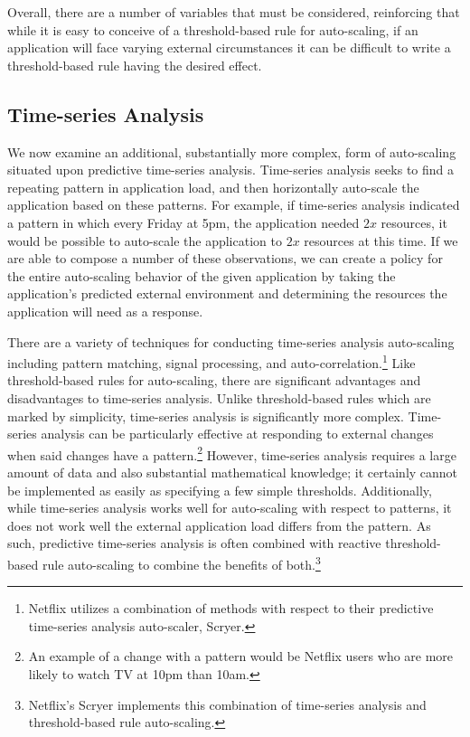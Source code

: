 \documentclass[twoside]{report}
\begin{document}
Overall, there are a number of variables that must be considered, reinforcing
that while it is easy to conceive of a threshold-based rule for auto-scaling, if
an application will face varying external circumstances it can be difficult to
write a threshold-based rule having the desired effect.

\subsection{Time-series Analysis}

We now examine an additional, substantially more complex, form of auto-scaling
situated upon predictive time-series analysis. Time-series analysis seeks to
find a repeating pattern in application load, and then horizontally auto-scale
the application based on these
patterns.\cite[pg. 29]{auto-scaling-techniques-for-elastic-applications-in-cloud-environments}
For example, if time-series analysis indicated a pattern in which
every Friday at 5pm, the application needed
$2x$ resources, it would be possible to auto-scale the application to $2x$
resources at this time. If we are able to compose a number of these
observations, we can create a policy for the entire auto-scaling behavior of
the given application by taking the application's predicted external environment
and determining the resources the application will need as a response.

There are a variety of techniques for conducting time-series analysis
auto-scaling including pattern matching, signal processing, and
auto-correlation.\footnote{Netflix utilizes a combination of methods with
respect to their predictive time-series analysis auto-scaler,
Scryer.\cite{netflix-scryer-part-ii}}\cite[pg.
32]{auto-scaling-techniques-for-elastic-applications-in-cloud-environments}
Like threshold-based rules for auto-scaling, there are significant
advantages and disadvantages to time-series analysis. Unlike threshold-based
rules which are marked by simplicity, time-series analysis is significantly more
complex. Time-series analysis can be particularly effective
at responding to external changes when said changes have a pattern.\footnote{An
example of a change with a pattern would be Netflix users who are more likely to
watch TV at 10pm than 10am.} However, time-series analysis requires a
large amount of data and also substantial mathematical
knowledge; it certainly cannot be implemented as easily as specifying a few
simple thresholds. Additionally, while time-series analysis works well for
auto-scaling with respect to patterns, it does not work well the external
application load differs from the pattern. As such, predictive time-series analysis is
often combined with reactive threshold-based rule auto-scaling to combine the benefits of
both.\footnote{Netflix's Scryer implements this combination of
time-series analysis and threshold-based rule
auto-scaling.\cite{netflix-scryer-part-ii}}
\end{document}
